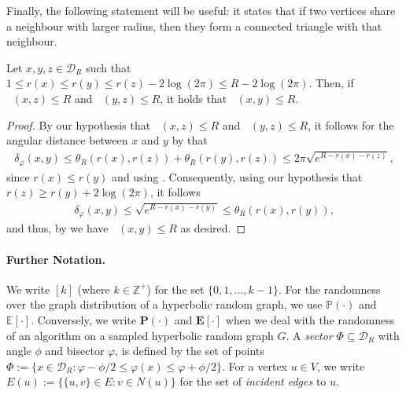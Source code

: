 \documentclass[letterpaper,11pt]{article}
\newcommand{\E}[1]{\mathbf{E}\left[#1\right]}
\newcommand{\Exp}[1]{\mathbb{E}\left[#1\right]}
\newcommand{\Prob}[1]{\mathbf{P}\left(#1\right)}
\newcommand{\Pro}[1]{\mathbb{P}\left(#1\right)}
\newcommand{\disk}{\ensuremath{\mathcal D_R}\xspace}
\newcommand{\1}{\mathbb I}
\DeclareMathOperator{\dist}{d_h}
\newcommand{\angulardist}[2]{\delta_\varphi(#1,#2)}
\begin{document}
Finally, the following statement will be useful: it states that if two vertices share a neighbour with larger radius, then they form a connected triangle with that neighbour.
%
\begin{lemma}\label{lem:triangle-inequality}
    Let $x,y,z \in \disk$ such that $1 \leq r(x) \leq r(y) \leq r(z) - 2\log(2\pi) \leq R -  2\log(2\pi)$. Then, if $\dist(x,z) \leq R$ and $\dist(y,z) \leq R$, it holds that $\dist(x,y) \leq R$.
\end{lemma}
%
\begin{proof}
By our hypothesis that $\dist(x,z) \leq R$ and $\dist(y,z) \leq R$, it follows for the angular distance between $x$ and $y$ by  that
%
\begin{align*}
  \angulardist{x}{y} \leq \theta_R(r(x), r(z)) + \theta_R(r(y), r(z)) \leq 2\pi\sqrt{e^{R-r(x)-r(z)}},
\end{align*}
%
since $r(x) \leq r(y)$ and using . Consequently, using our hypothesis that $r(z) \geq r(y) +  2\log(2\pi)$, it follows 
%
\begin{align*}
  \angulardist{x}{y} \leq \sqrt{e^{R-r(x)-r(y)}} \leq \theta_R(r(x), r(y)),
\end{align*}
%
and thus, by  we have $\dist(x,y) \leq R$ as desired.
\end{proof}

\paragraph{Further Notation.}
We write $[k]$ (where $k \in \mathbb{Z}^+$) for the set $\{0,1,\dots, k-1\}$. For the randomness over the graph distribution of a hyperbolic random graph, we use $\Pro{\cdot}$ and  $\Exp{\cdot}$. Conversely, we write $\Prob{\cdot}$ and  $\E{\cdot}$ when we deal with the randomness of an algorithm on a sampled hyperbolic random graph $G$. A \emph{sector} $\Phi \subseteq \disk$ with angle $\phi$ and bisector $\varphi$, is defined by the set of points $\Phi := \{x \in \disk : \varphi - \phi / 2 \leq \varphi(x) \leq \varphi + \phi / 2  \}$. For a vertex $u \in V$, we write $E(u) := \{\{u,v\} \in E : v \in N(u)\}$ for the set of \emph{incident edges} to $u$.
\newcommand{\independentset}[1]{\text{IS}({#1})}
\newcommand{\notindependentset}[1]{\text{OUT}({#1})}
\newcommand{\constant}{\ensuremath{1000}}
\newcommand{\algo}{HRG-Shattering-MIS\xspace}
\newcommand{\algomis}{Embedding-aware-MIS\xspace}
\newcommand{\algos}{HRG-Shattering-MM\xspace}
\newcommand{\algosmm}{Embedding-aware-MM\xspace}
\end{document}
